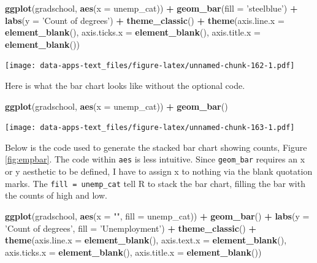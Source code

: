 \documentclass[
]{book}
\newenvironment{Shaded}{\begin{snugshade}}{\end{snugshade}}
\newcommand{\DataTypeTok}[1]{\textcolor[rgb]{0.13,0.29,0.53}{#1}}
\newcommand{\KeywordTok}[1]{\textcolor[rgb]{0.13,0.29,0.53}{\textbf{#1}}}
\newcommand{\NormalTok}[1]{#1}
\newcommand{\OperatorTok}[1]{\textcolor[rgb]{0.81,0.36,0.00}{\textbf{#1}}}
\newcommand{\StringTok}[1]{\textcolor[rgb]{0.31,0.60,0.02}{#1}}
\begin{document}
\begin{Shaded}
\begin{Highlighting}[]
\KeywordTok{ggplot}\NormalTok{(gradschool, }\KeywordTok{aes}\NormalTok{(}\DataTypeTok{x =}\NormalTok{ unemp_cat)) }\OperatorTok{+}
\StringTok{  }\KeywordTok{geom_bar}\NormalTok{(}\DataTypeTok{fill =} \StringTok{'steelblue'}\NormalTok{) }\OperatorTok{+}
\StringTok{  }\KeywordTok{labs}\NormalTok{(}\DataTypeTok{y =} \StringTok{'Count of degrees'}\NormalTok{) }\OperatorTok{+}
\StringTok{  }\KeywordTok{theme_classic}\NormalTok{() }\OperatorTok{+}
\StringTok{  }\KeywordTok{theme}\NormalTok{(}\DataTypeTok{axis.line.x =} \KeywordTok{element_blank}\NormalTok{(),}
        \DataTypeTok{axis.ticks.x =} \KeywordTok{element_blank}\NormalTok{(),}
        \DataTypeTok{axis.title.x =} \KeywordTok{element_blank}\NormalTok{())}
\end{Highlighting}
\end{Shaded}

\texttt{[image: data-apps-text\_files/figure-latex/unnamed-chunk-162-1.pdf]}

Here is what the bar chart looks like without the optional code.

\begin{Shaded}
\begin{Highlighting}[]
\KeywordTok{ggplot}\NormalTok{(gradschool, }\KeywordTok{aes}\NormalTok{(}\DataTypeTok{x =}\NormalTok{ unemp_cat)) }\OperatorTok{+}
\StringTok{  }\KeywordTok{geom_bar}\NormalTok{()}
\end{Highlighting}
\end{Shaded}

\texttt{[image: data-apps-text\_files/figure-latex/unnamed-chunk-163-1.pdf]}

Below is the code used to generate the stacked bar chart showing counts, Figure \ref{fig:empbar}. The code within \texttt{aes} is less intuitive. Since \texttt{geom\_bar} requires an x or y aesthetic to be defined, I have to assign x to nothing via the blank quotation marks. The \texttt{fill\ =\ unemp\_cat} tell R to stack the bar chart, filling the bar with the counts of high and low.

\begin{Shaded}
\begin{Highlighting}[]
\KeywordTok{ggplot}\NormalTok{(gradschool, }\KeywordTok{aes}\NormalTok{(}\DataTypeTok{x =} \StringTok{""}\NormalTok{, }\DataTypeTok{fill =}\NormalTok{ unemp_cat)) }\OperatorTok{+}
\StringTok{  }\KeywordTok{geom_bar}\NormalTok{() }\OperatorTok{+}
\StringTok{  }\KeywordTok{labs}\NormalTok{(}\DataTypeTok{y =} \StringTok{'Count of degrees'}\NormalTok{,}
       \DataTypeTok{fill =} \StringTok{'Unemployment'}\NormalTok{) }\OperatorTok{+}
\StringTok{  }\KeywordTok{theme_classic}\NormalTok{() }\OperatorTok{+}
\StringTok{  }\KeywordTok{theme}\NormalTok{(}\DataTypeTok{axis.line.x =} \KeywordTok{element_blank}\NormalTok{(),}
        \DataTypeTok{axis.text.x =} \KeywordTok{element_blank}\NormalTok{(),}
        \DataTypeTok{axis.ticks.x =} \KeywordTok{element_blank}\NormalTok{(),}
        \DataTypeTok{axis.title.x =} \KeywordTok{element_blank}\NormalTok{())}
\end{Highlighting}
\end{Shaded}
\end{document}
